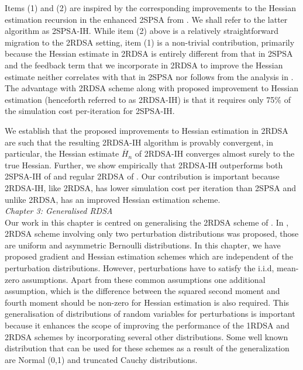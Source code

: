 \documentclass[12pt]{article}
\begin{document}
Items (1) and (2) are inspired by the corresponding improvements to the Hessian estimation recursion in the enhanced 2SPSA from \cite{spall-jacobian}. We shall refer to the latter algorithm as 2SPSA-IH. While item (2) above is a relatively straightforward migration to the 2RDSA setting, item (1) is a non-trivial contribution, primarily because the Hessian estimate in 2RDSA is entirely different from that in 2SPSA and the feedback term that we incorporate in 2RDSA to improve the Hessian estimate neither correlates with that in 2SPSA nor follows from the analysis in \cite{spall-jacobian}. 
The advantage with 2RDSA scheme along with proposed improvement to Hessian estimation (henceforth referred to as 2RDSA-IH) is that it requires only 75\% of the simulation cost per-iteration for 2SPSA-IH.

We establish that the proposed improvements to Hessian estimation in 2RDSA are such  that the resulting 2RDSA-IH algorithm is provably convergent, in particular, the Hessian estimate $\overline H_n$ of 2RDSA-IH converges almost surely to the true Hessian. 
Further, we show empirically that 2RDSA-IH outperforms both 2SPSA-IH of \cite{spall-jacobian} and regular 2RDSA of \cite{prashanth2015rdsa}. Our contribution is important because 2RDSA-IH, like 2RDSA, has lower simulation cost per iteration than 2SPSA and unlike 2RDSA, has an improved Hessian estimation scheme.\\




\textit{Chapter 3: Generalised RDSA}\\



Our work in this chapter is centred on generalising the 2RDSA scheme of \cite{prashanth2015rdsa}. In \cite{prashanth2015rdsa}, 2RDSA scheme involving only two perturbation distributions was proposed, those are uniform and asymmetric Bernoulli distributions. In this chapter, we have proposed gradient and Hessian estimation schemes which are independent of the perturbation distributions. However, perturbations have to satisfy the i.i.d, mean-zero assumptions. Apart from these common assumptions  one additional assumption, which is the difference between the squared second moment  and fourth moment should be non-zero for Hessian estimation is also required. This generalisation of distributions of random variables for perturbations is important because it enhances the scope of improving the performance of the 1RDSA and 2RDSA schemes by incorporating several other distributions. Some well known distribution that can be used for these schemes as a result of the generalization are Normal (0,1) and truncated Cauchy distributions.\\
 
\end{document}
